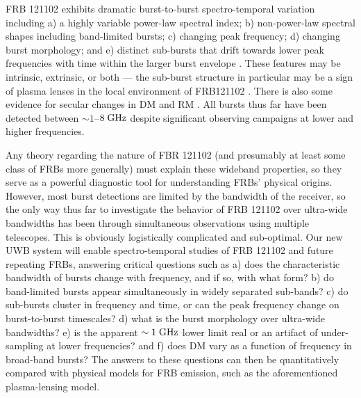 \documentclass[10pt]{myNSF}
\begin{document}
FRB 121102 exhibits dramatic burst-to-burst spectro-temporal variation
including a) a highly variable power-law spectral index; b)
non-power-law spectral shapes including band-limited bursts; c)
changing peak frequency; d) changing burst morphology; and e) distinct
sub-bursts that drift towards lower peak frequencies with time within
the larger burst envelope \citep{ssh+16b}.  These features may be
intrinsic, extrinsic, or both --- the sub-burst structure in
particular may be a sign of plasma lenses in the local environment of
FRB121102 \citep{cwh+17,myc+18}.  There is also some evidence for
secular changes in DM and RM \citep{msh+18,gsp+18}.  All bursts thus
far have been detected between $\sim 1$--$8\; \textrm{GHz}$ despite
significant observing campaigns at lower and higher frequencies.

Any theory regarding the nature of FBR 121102 (and presumably at least
some class of FRBs more generally) must explain these wideband
properties, so they serve as a powerful diagnostic tool for
understanding FRBs' physical origins.  However, most burst detections
are limited by the bandwidth of the receiver, so the only way thus far
to investigate the behavior of FRB 121102 over ultra-wide bandwidths
has been through simultaneous observations using multiple telescopes.
This is obviously logistically complicated and sub-optimal.  Our new
UWB system will enable spectro-temporal studies of FRB 121102 and
future repeating FRBs, answering critical questions such as a) does
the characteristic bandwidth of bursts change with frequency, and if
so, with what form? b) do band-limited bursts appear simultaneously in
widely separated sub-bands? c) do sub-bursts cluster in frequency and
time, or can the peak frequency change on burst-to-burst timescales?
d) what is the burst morphology over ultra-wide bandwidths? e) is the
apparent $\sim 1\; \textrm{GHz}$ lower limit real or an artifact of
under-sampling at lower frequencies? and f) does DM vary as a function
of frequency in broad-band bursts?  The answers to these questions can
then be quantitatively compared with physical models for FRB emission,
such as the aforementioned plasma-lensing model.
\end{document}
